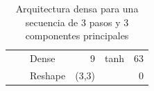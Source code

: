 \begin{table}[]
\begin{center}
\begin{tabular}{ll|l|r|l|r|}
\multicolumn{1}{|l|}{}                              &                             & Dense                              & 9                                    & tanh                                     & 63                                          \\ \cline{3-6} 
\multicolumn{1}{|l|}{}                              &                             & Reshape                            & (3,3)                                &                                          & 0                                           \\ \hline
\end{tabular}
\end{center}
\caption{Arquitectura densa para una secuencia de 3 pasos y 3 componentes principales}
\label{table:dense33}
\end{table}








